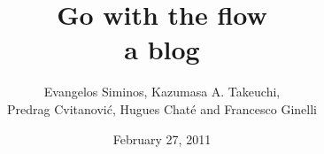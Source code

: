 \title{ 			Go with the flow
       \\ \Huge 	a blog
        \\\vspace{1.0cm}
        }\author{Evangelos Siminos,
		Kazumasa A. Takeuchi,
		\\
        Predrag Cvitanovi\'{c},
        Hugues Chat\'e and Francesco Ginelli
        }

        \date{February 27, 2011} \Private{\date{\today}}
